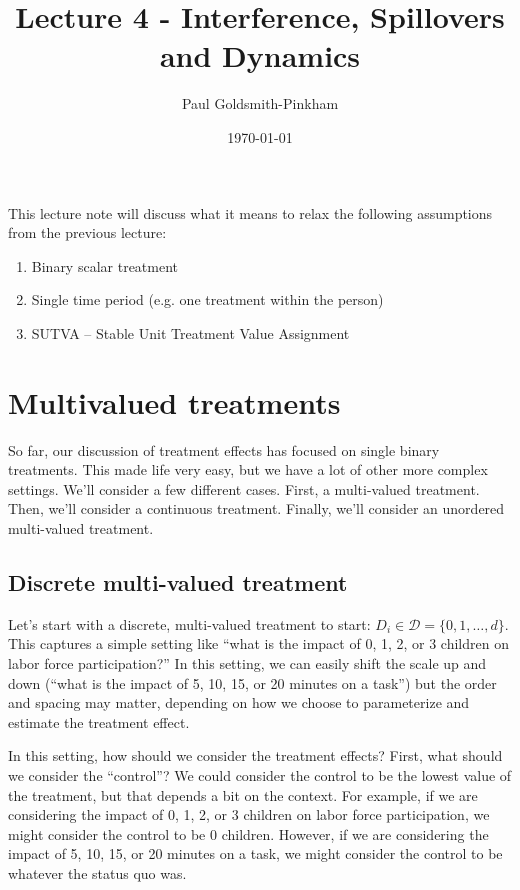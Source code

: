 \documentclass{tufte-handout}
\title{Lecture 4 - Interference, Spillovers and Dynamics}
\author{Paul Goldsmith-Pinkham}
\date{\today}
\theoremstyle{break}
\begin{document}
\maketitle

This lecture note will discuss what it means to relax the following assumptions from the previous lecture:
\begin{enumerate}
        \item Binary scalar treatment
        \item Single time period (e.g. one treatment within the person)
        \item SUTVA -- Stable Unit Treatment Value Assignment
\end{enumerate}

\section{Multivalued treatments}
So far, our discussion of treatment effects has focused on single binary treatments. This made life very easy, but we have a lot of other more complex settings. We'll consider a few different cases. First, a multi-valued treatment. Then, we'll consider a continuous treatment. Finally, we'll consider an unordered multi-valued treatment.


\subsection{Discrete multi-valued treatment}
Let's start with a discrete, multi-valued treatment to start: $D_{i} \in \mathcal{D} = \{0,1, \ldots, d\}$. This captures a simple setting like ``what is the impact of 0, 1, 2, or 3 children on labor force participation?'' In this setting, we can easily shift the scale up and down (``what is the impact of 5, 10, 15, or 20 minutes on a task'') but the order and spacing may matter, depending on how we choose to parameterize and estimate the treatment effect.

In this setting, how should  we consider the treatment effects? First, what should we consider the ``control''? We could consider the control to be the lowest value of the treatment, but that depends a bit on the context. For example, if we are considering the impact of 0, 1, 2, or 3 children on labor force participation, we might consider the control to be 0 children. However, if we are considering the impact of 5, 10, 15, or 20 minutes on a task, we might consider the control to be whatever the status quo was.
\end{document}
